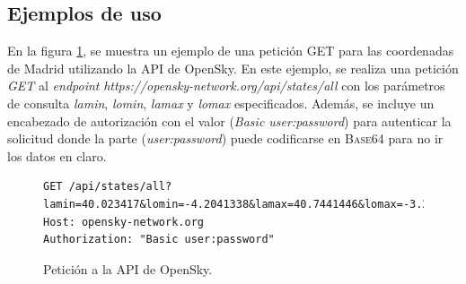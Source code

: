 \documentclass[a4paper, 11pt]{book}
\begin{document}
\subsection{Ejemplos de uso}
En la figura \ref{fig:getOpensky}, se muestra un ejemplo de una petición GET para las coordenadas de Madrid utilizando la \gls{API} de OpenSky.
En este ejemplo, se realiza una petición \emph{GET} al \emph{endpoint} \emph{https://opensky-network.org/api/states/all} con los parámetros de consulta \emph{lamin}, \emph{lomin}, \emph{lamax} y \emph{lomax} especificados. Además, se incluye un encabezado de autorización con el valor (\emph{Basic user:password}) para autenticar la solicitud donde la parte (\emph{user:password}) puede codificarse en \textsc{Base64} para no ir los datos en claro.
\begin{figure}[h]
	\centering
	\begin{verbatim}
GET /api/states/all?lamin=40.023417&lomin=-4.2041338&lamax=40.7441446&lomax=-3.2538165
Host: opensky-network.org
Authorization: "Basic user:password"
	\end{verbatim}
	\caption{Petición a la API de OpenSky.}
	\label{fig:getOpensky}
\end{figure}
\end{document}
